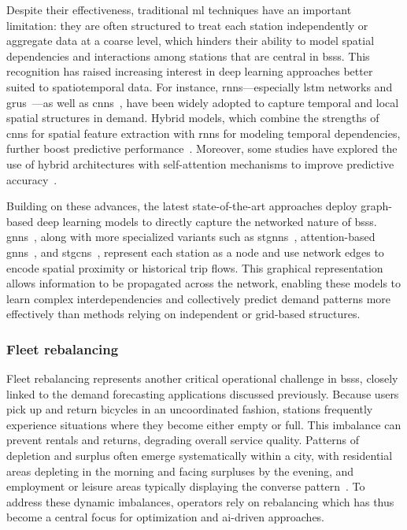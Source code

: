     Despite their effectiveness, traditional \ac{ml} techniques have an important limitation: they are often structured to treat each station independently or aggregate data at a coarse level, which hinders their ability to model spatial dependencies and interactions among stations that are central in \acp{bss}. This recognition has raised increasing interest in deep learning approaches better suited to spatiotemporal data. For instance, \acp{rnn}—especially \ac{lstm} networks and \acp{gru}~\cite{Wang2018, Zhang2018LSTM}—as well as \acp{cnn}~\cite{Ruffieux2017}, have been widely adopted to capture temporal and local spatial structures in demand. Hybrid models, which combine the strengths of \acp{cnn} for spatial feature extraction with \acp{rnn} for modeling temporal dependencies, further boost predictive performance~\cite{Mehdizadeh2022}. Moreover, some studies have explored the use of hybrid architectures with self-attention mechanisms to improve predictive accuracy~\cite{Ma2024}.

    Building on these advances, the latest state-of-the-art approaches deploy graph-based deep learning models to directly capture the networked nature of \acp{bss}. \acp{gnn}~\cite{Liang2023}, along with more specialized variants such as \acp{stgnn}~\cite{Feng2024}, attention-based \acp{gnn}~\cite{Polamarasetti2025}, and \acp{stgcn}~\cite{Xiao2021}, represent each station as a node and use network edges to encode spatial proximity or historical trip flows. This graphical representation allows information to be propagated across the network, enabling these models to learn complex interdependencies and collectively predict demand patterns more effectively than methods relying on independent or grid-based structures.


    \subsubsection{Fleet rebalancing}

    Fleet rebalancing represents another critical operational challenge in \acp{bss}, closely linked to the demand forecasting applications discussed previously. Because users pick up and return bicycles in an uncoordinated fashion, stations frequently experience situations where they become either empty or full. This imbalance can prevent rentals and returns, degrading overall service quality. Patterns of depletion and surplus often emerge systematically within a city, with residential areas depleting in the morning and facing surpluses by the evening, and employment or leisure areas typically displaying the converse pattern~\cite{Chiariotti2018}. To address these dynamic imbalances, operators rely on rebalancing which has thus become a central focus for optimization and \ac{ai}-driven approaches.


